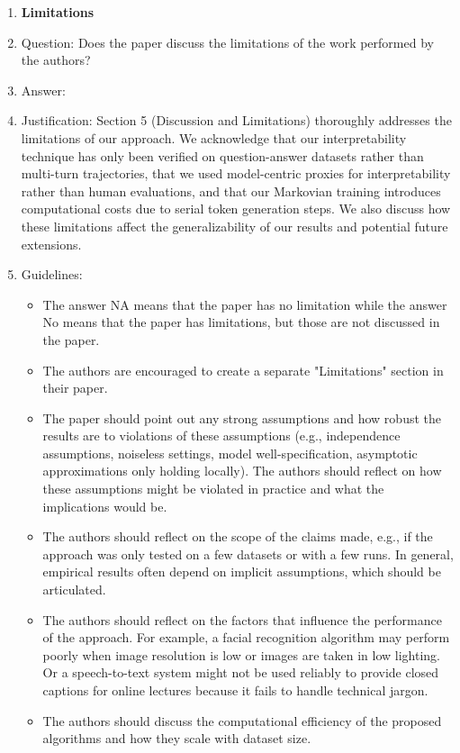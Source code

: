 \documentclass{article}
\begin{document}
\begin{enumerate}
\item {\bf Limitations}
    \item[] Question: Does the paper discuss the limitations of the work performed by the authors?
    \item[] Answer: \answerYes{} %
    \item[] Justification: Section 5 (Discussion and Limitations) thoroughly addresses the limitations of our approach. We acknowledge that our interpretability technique has only been verified on question-answer datasets rather than multi-turn trajectories, that we used model-centric proxies for interpretability rather than human evaluations, and that our Markovian training introduces computational costs due to serial token generation steps. We also discuss how these limitations affect the generalizability of our results and potential future extensions.
    \item[] Guidelines:
    \begin{itemize}
        \item The answer NA means that the paper has no limitation while the answer No means that the paper has limitations, but those are not discussed in the paper. 
        \item The authors are encouraged to create a separate "Limitations" section in their paper.
        \item The paper should point out any strong assumptions and how robust the results are to violations of these assumptions (e.g., independence assumptions, noiseless settings, model well-specification, asymptotic approximations only holding locally). The authors should reflect on how these assumptions might be violated in practice and what the implications would be.
        \item The authors should reflect on the scope of the claims made, e.g., if the approach was only tested on a few datasets or with a few runs. In general, empirical results often depend on implicit assumptions, which should be articulated.
        \item The authors should reflect on the factors that influence the performance of the approach. For example, a facial recognition algorithm may perform poorly when image resolution is low or images are taken in low lighting. Or a speech-to-text system might not be used reliably to provide closed captions for online lectures because it fails to handle technical jargon.
        \item The authors should discuss the computational efficiency of the proposed algorithms and how they scale with dataset size.

\end{itemize}
\end{enumerate}
\end{document}
